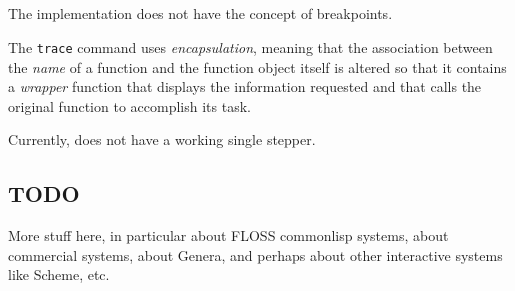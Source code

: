 \subsection{\ccl{}}

The \ccl{} \commonlisp{} implementation does not have the concept of
breakpoints.

The \ccl{} \texttt{trace} command uses \emph{encapsulation}, meaning
that the association between the \emph{name} of a function and the
function object itself is altered so that it contains a \emph{wrapper}
function that displays the information requested and that calls the
original function to accomplish its task.

Currently, \ccl{} does not have a working single stepper.

\subsection{TODO}

More stuff here, in particular about FLOSS commonlisp{} systems, about
commercial \commonlisp{} systems, about Genera, and perhaps about
other interactive systems like Scheme, etc.
